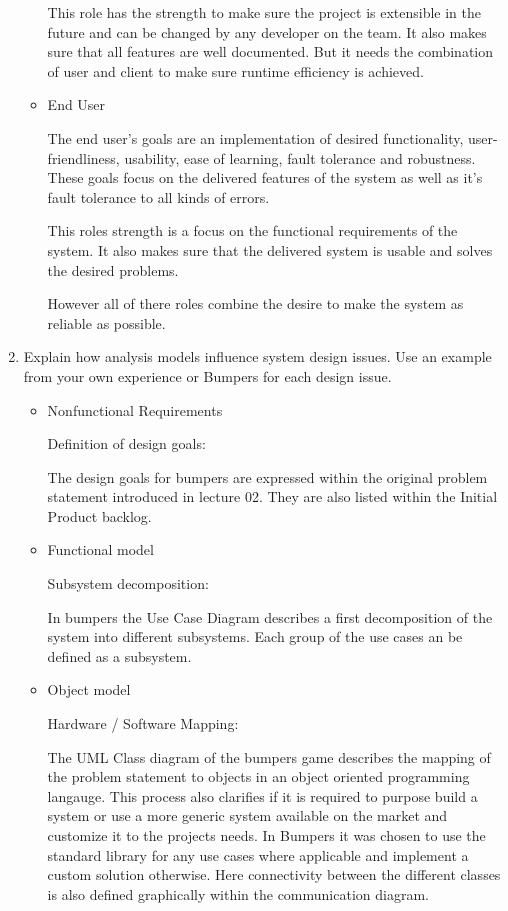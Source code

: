 \documentclass[a4paper, 10pt]{article}
\begin{document}
\begin{enumerate}
\begin{itemize}
        This role has the strength to make sure the project is extensible in the future and can be changed by any 
        developer on the team. It also makes sure that all features are well documented. But it needs the combination of 
        user and client to make sure runtime efficiency is achieved. 
        \item End User

        The end user's goals are an implementation of desired functionality, user-friendliness, usability,
        ease of learning, fault tolerance and robustness.
        These goals focus on the delivered features of the system as well as it's fault tolerance to all kinds of 
        errors.

        This roles strength is a focus on the functional requirements of the system. It also makes sure that 
        the delivered system is usable and solves the desired problems.

        However all of there roles combine the desire to make the system as reliable as possible.
    \end{itemize}
    \item
    Explain how analysis models influence system design issues. Use an
    example from your own experience or Bumpers for each design issue.
    \vspace{0.5cm}

    \begin{itemize}
        \item Nonfunctional Requirements

        Definition of design goals:
        
        The design goals for bumpers are expressed within the original problem statement introduced in lecture 02. 
        They are also listed within the Initial Product backlog.
        \item Functional model 

        Subsystem decomposition:    

        In bumpers the Use Case Diagram describes a first decomposition of the system into different subsystems.
        Each group of the use cases an be defined as a subsystem.

        \item Object model

        Hardware / Software Mapping:

        The UML Class diagram of the bumpers game describes the mapping of the problem statement to objects in an 
        object oriented programming langauge. This process also clarifies if it is required to purpose build a system or 
        use a more generic system available on the market and customize it to the projects needs. In Bumpers it was chosen to 
        use the standard library for any use cases where applicable and implement a custom solution otherwise.
        Here connectivity between the different classes is also defined graphically within the communication diagram.


\end{itemize}
\end{enumerate}
\end{document}
